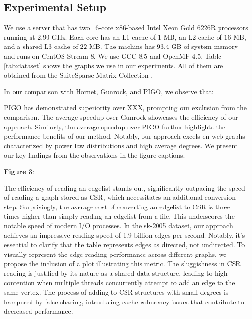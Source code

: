 \subsection{Experimental Setup}
\label{sec:setup}

We use a server that has two $16$-core x86-based Intel Xeon Gold 6226R processors running at $2.90$ GHz. Each core has an L1 cache of $1$ MB, an L2 cache of $16$ MB, and a shared L3 cache of $22$ MB. The machine has $93.4$ GB of system memory and runs on CentOS Stream 8. We use GCC 8.5 and OpenMP 4.5. Table \ref{tab:dataset} shows the graphs we use in our experiments. All of them are obtained from the SuiteSparse Matrix Collection \cite{kolodziej2019suitesparse}.









In our comparison with Hornet, Gunrock, and PIGO, we observe that:

PIGO has demonstrated superiority over XXX, prompting our exclusion from the comparison.
The average speedup over Gunrock showcases the efficiency of our approach.
Similarly, the average speedup over PIGO further highlights the performance benefits of our method.
Notably, our approach excels on web graphs characterized by power law distributions and high average degrees.
We present our key findings from the observations in the figure captions.


\textbf{Figure 3}:

The efficiency of reading an edgelist stands out, significantly outpacing the speed of reading a graph stored as CSR, which necessitates an additional conversion step. Surprisingly, the average cost of converting an edgelist to CSR is three times higher than simply reading an edgelist from a file. This underscores the notable speed of modern I/O processes. In the sk-2005 dataset, our approach achieves an impressive reading speed of 1.9 billion edges per second. Notably, it's essential to clarify that the table represents edges as directed, not undirected. To visually represent the edge reading performance across different graphs, we propose the inclusion of a plot illustrating this metric. The sluggishness in CSR reading is justified by its nature as a shared data structure, leading to high contention when multiple threads concurrently attempt to add an edge to the same vertex. The process of adding to CSR structures with small degrees is hampered by false sharing, introducing cache coherency issues that contribute to decreased performance.

